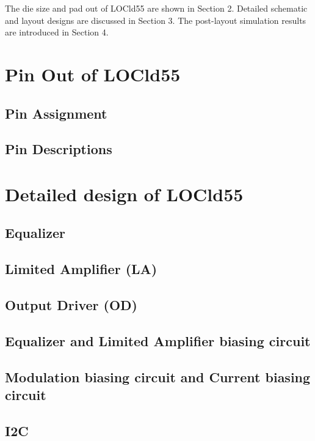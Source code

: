 \documentclass[11pt,a4paper]{article}
\begin{document}
\begin{spacing}{1.25}
The die size and pad out of LOCld55 are shown in Section 2. Detailed schematic and layout designs are discussed in Section 3. The post-layout simulation results are introduced in Section 4.

\section{Pin Out of LOCld55}                %

\subsection{Pin Assignment}

\subsection{Pin Descriptions}

\section{Detailed design of LOCld55}        %
\subsection{Equalizer}

\subsection{Limited Amplifier (LA)}

\subsection{Output Driver (OD)}

\subsection{Equalizer and Limited Amplifier biasing circuit}

\subsection{Modulation biasing circuit and Current biasing circuit}

\subsection{I2C}


\end{spacing}
\end{document}
